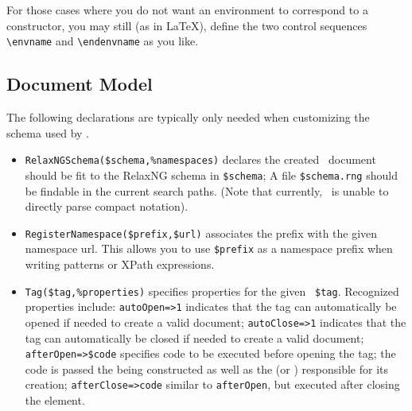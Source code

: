 \documentclass{book}
\newcommand{\ltxcode}{\lstinline[style=latexml]}
\begin{document}
For those cases where you do not want an environment to correspond
to a constructor, you may still (as in \LaTeX), define the
two control sequences \verb|\envname| and \verb|\endenvname|
as you like.

\subsection{Document Model}\label{customization.latexml.schema}
The following declarations are typically only needed when customizing
the schema used by \LaTeXML.
\begin{itemize}
\item \ltxcode|RelaxNGSchema($schema,%
 \XML\ document should be fit to the RelaxNG schema in \ltxcode|$schema|;
 A file \ltxcode|$schema.rng| should be findable in the current search paths.
(Note that currently, \LaTeXML\ is unable to directly parse compact notation).
\item \ltxcode|RegisterNamespace($prefix,$url)| associates the
 prefix with the given namespace url.  This allows you to use \ltxcode|$prefix|
 as a namespace prefix when writing  patterns or XPath expressions.
\item \ltxcode|Tag($tag,%
Recognized properties include:
\ltxcode|autoOpen=>1| indicates that the tag
can automatically be opened if needed to create a valid document;
\ltxcode|autoClose=>1| indicates that the tag can automatically be closed if needed to create
a valid document;
\ltxcode|afterOpen=>$code| specifies code to be executed before opening the tag;
the code is passed the  being constructed as well as the
 (or ) responsible for its creation;
\ltxcode|afterClose=>code| similar to \texttt{afterOpen}, but executed after closing
the element.
\end{itemize}
\end{document}

